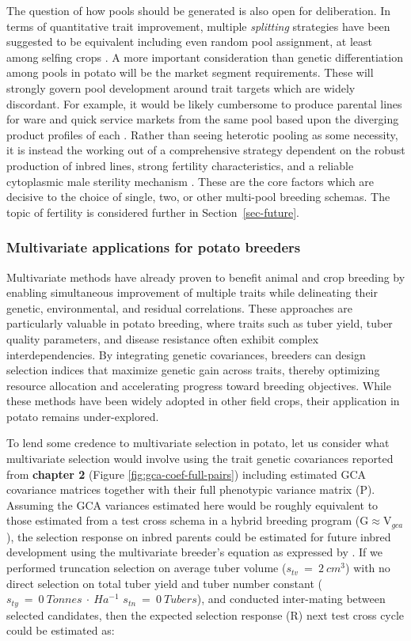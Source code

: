 \documentclass[
]{article}
\begin{document}
The question of how pools should be generated is also open for
deliberation. In terms of quantitative trait improvement, multiple
\emph{splitting} strategies have been suggested to be equivalent
including even random pool assignment, at least among selfing crops
\autocite{Cowling2020}. A more important consideration than genetic
differentiation among pools in potato will be the market segment
requirements. These will strongly govern pool development around trait
targets which are widely discordant. For example, it would be likely
cumbersome to produce parental lines for ware and quick service markets
from the same pool based upon the diverging product profiles of each
\autocite{Keijbets2008}. Rather than seeing heterotic pooling as some
necessity, it is instead the working out of a comprehensive strategy
dependent on the robust production of inbred lines, strong fertility
characteristics, and a reliable cytoplasmic male sterility mechanism
\autocite{McGrath2018,Eggers2024}. These are the core factors which are
decisive to the choice of single, two, or other multi-pool breeding
schemas. The topic of fertility is considered further in
Section~\ref{sec-future}.

\subsubsection{Multivariate applications for potato
breeders}\label{sec-implications}

Multivariate methods have already proven to benefit animal and crop
breeding by enabling simultaneous improvement of multiple traits while
delineating their genetic, environmental, and residual correlations.
These approaches are particularly valuable in potato breeding, where
traits such as tuber yield, tuber quality parameters, and disease
resistance often exhibit complex interdependencies. By integrating
genetic covariances, breeders can design selection indices that maximize
genetic gain across traits, thereby optimizing resource allocation and
accelerating progress toward breeding objectives. While these methods
have been widely adopted in other field crops, their application in
potato remains under-explored.

To lend some credence to multivariate selection in potato, let us
consider what multivariate selection would involve using the trait
genetic covariances reported from \textbf{chapter 2} (Figure
\ref{fig:gca-coef-full-pairs}) including estimated GCA covariance
matrices together with their full phenotypic variance matrix
(\(\mathrm P\)). Assuming the GCA variances estimated here would be
roughly equivalent to those estimated from a test cross schema in a
hybrid breeding program (\(\mathrm {G} \approx \mathrm {V}_{gca}\)), the
selection response on inbred parents could be estimated for future
inbred development using the multivariate breeder's equation as
expressed by \textcite{Lande1983}. If we performed truncation selection
on average tuber volume (\(s_{tv}~=~2~cm^3\)) with no direct selection
on total tuber yield and tuber number constant
(\(s_{ty}~=~0~Tonnes~\cdot~Ha^{-1}\) \(s_{tn}~=~0~Tubers\)), and
conducted inter-mating between selected candidates, then the expected
selection response (\(\mathrm R\)) next test cross cycle could be
estimated as:
\end{document}

